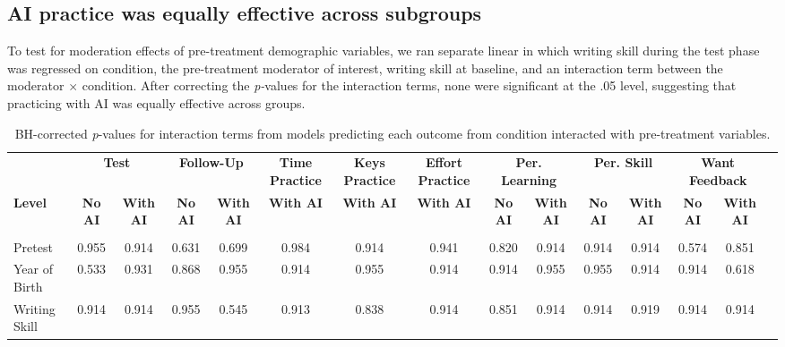 \documentclass[11pt]{report}
\begin{document}
\begin{append}
\subsection{AI practice was equally effective across subgroups}

To test for moderation effects of pre-treatment demographic variables, we ran separate linear in which writing skill during the test phase was regressed on condition, the pre-treatment moderator of interest, writing skill at baseline, and an interaction term between the moderator $\times$ condition. After correcting the \textit{p-}values for the interaction terms, none were significant at the .05 level, suggesting that practicing with AI was equally effective across groups.

\begin{table}[ht]
    \centering
    \caption{BH-corrected \textit{p}-values for interaction terms from models predicting each outcome from condition interacted with pre-treatment variables.}
    \label{tab:interactions2}
        \begin{tabular}{@{\extracolsep{-4pt}}lcccccccccccccc}
    \toprule
    & \multicolumn{2}{c}{\textbf{Test}} & \multicolumn{2}{c}{\textbf{Follow-Up}} & \textbf{Time Practice} & \textbf{Keys Practice} & \textbf{Effort Practice} & \multicolumn{2}{c}{\textbf{Per. Learning}} & \multicolumn{2}{c}{\textbf{Per. Skill}} & \multicolumn{2}{c}{\textbf{Want Feedback}} \\ 
    \cmidrule(lr){2-3} \cmidrule(lr){4-5} \cmidrule(lr){6-6} \cmidrule(lr){7-7} \cmidrule(lr){8-8} \cmidrule(lr){9-10} \cmidrule(lr){11-12} \cmidrule(lr){13-14}
    \textbf{Level} & \textbf{No AI} & \textbf{With AI} & \textbf{No AI} & \textbf{With AI} & \textbf{With AI} & \textbf{With AI} & \textbf{With AI} & \textbf{No AI} & \textbf{With AI} & \textbf{No AI} & \textbf{With AI} & \textbf{No AI} & \textbf{With AI} \\ 
    \midrule
    \addlinespace[2.5pt]
    \multicolumn{14}{l}{\textbf{Continuous Moderators}} \\ 
    \midrule
    Pretest         & 0.955 & 0.914 & 0.631 & 0.699 & 0.984 & 0.914 & 0.941 & 0.820 & 0.914 & 0.914 & 0.914 & 0.574 & 0.851 \\ 
    Year of Birth   & 0.533 & 0.931 & 0.868 & 0.955 & 0.914 & 0.955 & 0.914 & 0.914 & 0.955 & 0.955 & 0.914 & 0.914 & 0.618 \\ 
    Writing Skill   & 0.914 & 0.914 & 0.955 & 0.545 & 0.913 & 0.838 & 0.914 & 0.851 & 0.914 & 0.914 & 0.919 & 0.914 & 0.914 \\ 

\end{tabular}
\end{table}
\end{append}
\end{document}
